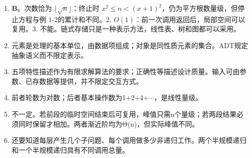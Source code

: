 {\begin{recallcard}

\begin{enumerate}
\def\labelenumi{\arabic{enumi}.}
\item
  \textbf{B}。次数恰为 \(\lfloor\sqrt n\rfloor\)：终止时 \(x^2\le n<(x+1)^2\)，仍为平方根数量级，但停止方程与例 1-2的累计和不同。2. \(O(1)\)：前一次调用返回后，局部空间可以复用。3. 不能。链式存储只是一种表示方法，线性表、树和图都可以采用。
\item
  元素是处理的基本单位，由数据项组成；对象是同性质元素的集合。ADT规定抽象语义而不限定表示。
\item
  五项特性描述作为有限求解算法的要求；正确性等描述设计质量。输入可由参数、已存数据等提供，并不限定交互方式。
\item
  前者轮数为对数；后者基本操作数为1+2+4+\ensuremath{\cdots}，是线性量级。
\item
  不一定。若前段的临时空间结束后可复用，峰值只需n个量级；若两段结果必须同时保留才相加。两者渐近阶均为Θ(n)，但实际峰值不同。
\item
  还要知道每层产生几个子问题、每个调用做多少非递归工作。两个半规模递归和一个半规模递归具有不同调用总量。
\end{enumerate}

\end{recallcard}}
